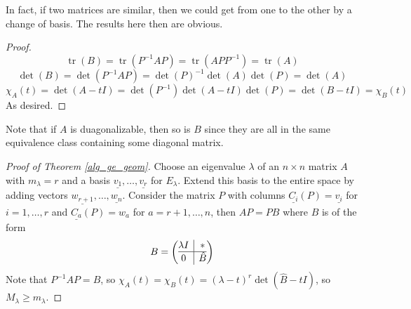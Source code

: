 In fact, if two matrices are similar, then we could get from one to the other by a change of basis.
The results here then are obvious.
\begin{proof}
    $$\operatorname{tr}(B)=\operatorname{tr}(P^{-1}AP)=\operatorname{tr}(APP^{-1})=\operatorname{tr}(A)$$
    $$\det(B)=\det(P^{-1}AP)=\det(P)^{-1}\det(A)\det(P)=\det(A)$$
    $$\chi_A(t)=\det(A-tI)=\det(P^{-1})\det(A-tI)\det(P)=\det(B-tI)=\chi_B(t)$$
    As desired.
\end{proof}
Note that if $A$ is duagonalizable, then so is $B$ since they are all in the same equivalence class containing some diagonal matrix.
\begin{proof}[Proof of Theorem \ref{alg_ge_geom}]
    Choose an eigenvalue $\lambda$ of an $n\times n$ matrix $A$ with $m_\lambda=r$ and a basis $\underline{v_1},\ldots,\underline{v_r}$ for $E_{\lambda}$.
    Extend this basis to the entire space by adding vectors $\underline{w_{r+1}},\ldots,\underline{w_n}$.
    Consider the matrix $P$ with columns $\underline{C_i}(P)=\underline{v_i}$ for $i=1,\ldots,r$ and $\underline{C_a}(P)=w_a$ for $a=r+1,\ldots,n$, then $AP=PB$ where $B$ is of the form
    $$B=\left(\begin{array}{@{}c|c@{}}
        \lambda I&*\\
        \hline
        0&\hat{B}
    \end{array}\right)$$
    Note that $P^{-1}AP=B$, so $\chi_A(t)=\chi_B(t)=(\lambda-t)^r\det(\hat{B}-tI)$, so $M_\lambda\ge m_\lambda$.
\end{proof}
